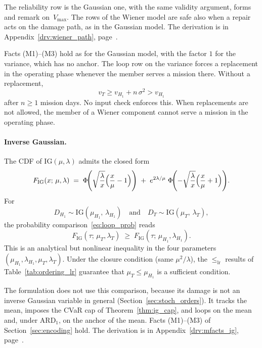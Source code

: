 \documentclass[11pt,a4paper]{article}
\theoremstyle{plain}
\theoremstyle{definition}
\theoremstyle{remark}
\begin{document}
The reliability row is the Gaussian one, with the same validity argument, forms and remark on~$V_{\max}$.
The rows of the Wiener model are safe also when a repair acts on the damage path, as in the Gaussian model.
The derivation is in Appendix~\ref{drv:wiener_path}, page~\pageref{drv:wiener_path}.

Facts (M1)--(M3) hold as for the Gaussian model, with the factor $1$ for the variance, which has no anchor.
The loop row on the variance forces a replacement in the operating phase whenever the member serves a mission there.
Without a replacement,
\begin{equation}
  v_T \ge v_{H_1} + n\,\sigma^2 > v_{H_1}
\end{equation}
after $n \ge 1$ mission days.
No input check enforces this.
When replacements are not allowed, the member of a Wiener component cannot serve a mission in the operating phase.

\paragraph{Inverse Gaussian.}
The CDF of $\mathrm{IG}(\mu,\lambda)$ admits the closed form
\begin{equation}\label{eq:ig_cdf}
  F_{\mathrm{IG}}(x;\,\mu,\lambda) \;=\;
    \Phi\!\Biggl(\sqrt{\frac{\lambda}{x}}\Bigl(\frac{x}{\mu}-1\Bigr)\Biggr)
    \;+\; e^{2\lambda/\mu}\;
    \Phi\!\Biggl(-\sqrt{\frac{\lambda}{x}}\Bigl(\frac{x}{\mu}+1\Bigr)\Biggr).
\end{equation}
For
\begin{equation}
  D_{H_1} \sim \mathrm{IG}(\mu_{H_1},\,\lambda_{H_1})
  \quad\text{and}\quad
  D_T \sim \mathrm{IG}(\mu_T,\,\lambda_T),
\end{equation}
the probability comparison~\eqref{eq:loop_prob} reads
\begin{equation}
  F_{\mathrm{IG}}(\tau;\,\mu_T,\lambda_T) \;\ge\; F_{\mathrm{IG}}(\tau;\,\mu_{H_1},\lambda_{H_1}).
\end{equation}
This is an analytical but nonlinear inequality in the four parameters $(\mu_{H_1},\lambda_{H_1},\mu_T,\lambda_T)$.
Under the closure condition (same $\mu^2/\lambda$), the $\le_{\mathrm{lr}}$ results of Table~\ref{tab:ordering_lr} guarantee that $\mu_T \le \mu_{H_1}$ is a sufficient condition.

The formulation does not use this comparison, because its damage is not an inverse Gaussian variable in general (Section~\ref{sec:stoch_orders}).
It tracks the mean, imposes the CVaR cap of Theorem~\ref{thm:ig_cap}, and loops on the mean and, under $\text{ARD}_1$, on the anchor of the mean.
Facts (M1)--(M3) of Section~\ref{sec:encoding} hold.
The derivation is in Appendix~\ref{drv:mfacts_ig}, page~\pageref{drv:mfacts_ig}.
\end{document}

